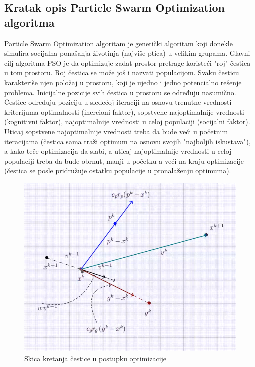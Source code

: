\documentclass[12pt, a4paper]{article}
\begin{document}
    \subsection{Kratak opis Particle Swarm Optimization algoritma}
    Particle Swarm Optimization algoritam je genetički algoritam koji donekle simulira socijalna ponašanja životinja (najviše ptica) u velikim grupama. 
    Glavni cilj algoritma PSO je da optimizuje zadat prostor pretrage koristeći "roj" čestica u tom prostoru. 
    Roj čestica se može još i nazvati populacijom. Svaku česticu karakteriše njen položaj u prostoru, koji je ujedno i jedno potencialno rešenje problema. 
    Inicijalne pozicije svih čestica u prostoru se određuju nasumično. 
    Čestice određuju poziciju u sledećoj iteraciji na osnovu trenutne vrednosti kriterijuma optimalnosti (inercioni faktor), sopstvene najoptimalnije vrednosti (kognitivni faktor), najoptimalnije vrednosti u celoj populaciji (socijalni faktor).
    Uticaj sopstvene najoptimalnije vrednosti treba da bude veći u početnim iteracijama (čestica sama traži optimum na osnovu svojih "najboljih iskustava"), a kako teče optimizacija da slabi, a uticaj najoptimalnije vrednosti u celoj populaciji treba da bude obrnut, manji u početku a veći na kraju optimizacije (čestica se posle pridružuje ostatku populacije u pronalaženju optimuma). \\
    \begin{figure}[h]
        \centering
        \includegraphics[scale=0.5]{PSO - skica kretanja.png}
        \caption{Skica kretanja čestice u postupku optimizacije}
        \label{fig:Walking sketch}
    \end{figure}
    
\end{document}
